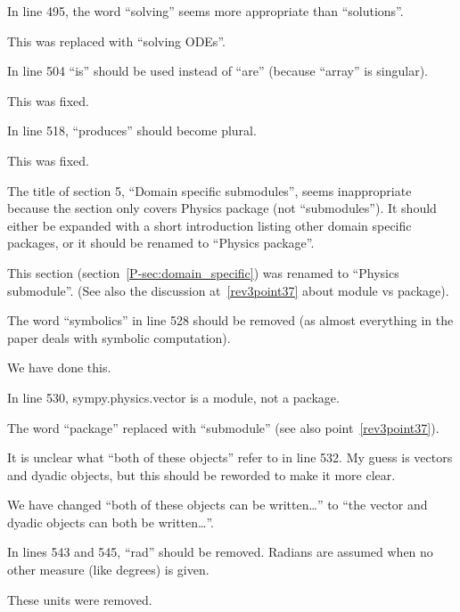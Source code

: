 \documentclass[answers,12pt]{exam}
\begin{document}
\begin{questions}
\question In line 495, the word ``solving'' seems more appropriate than ``solutions''.
\begin{solution}
This was replaced with ``solving ODEs''.
\end{solution}

\question In line 504 ``is'' should be used instead of ``are'' (because ``array'' is singular).
\begin{solution}
This was fixed.
\end{solution}

\question In line 518, ``produces'' should become plural.
\begin{solution}
This was fixed.
\end{solution}

\question The title of section 5, ``Domain specific submodules'', seems inappropriate because the section only covers Physics package (not ``submodules''). It should either be expanded with a short introduction listing other domain specific packages, or it should be renamed to ``Physics package''.
\begin{solution}
\label{rev3point30}
This section (section~\ref{P-sec:domain_specific}) was renamed to ``Physics submodule''.  (See also the
discussion at~\ref{rev3point37} about module vs package).
\end{solution}

\question The word ``symbolics'' in line 528 should be removed (as almost everything in the paper deals with symbolic computation).
\begin{solution}
We have done this.
\end{solution}

\question In line 530, sympy.physics.vector is a module, not a package.
\begin{solution}
The word ``package'' replaced with ``submodule'' (see also point~\ref{rev3point37}).
\end{solution}

\question It is unclear what ``both of these objects'' refer to in line 532. My guess is vectors and dyadic objects, but this should be reworded to make it more clear.
\begin{solution}
We have changed ``both of these objects can be written\ldots'' to ``the vector
and dyadic objects can both be written\ldots''.
\end{solution}

\question In lines 543 and 545, ``rad'' should be removed. Radians are assumed when no other measure (like degrees) is given.
\begin{solution}
These units were removed.
\end{solution}


\end{questions}
\end{document}
